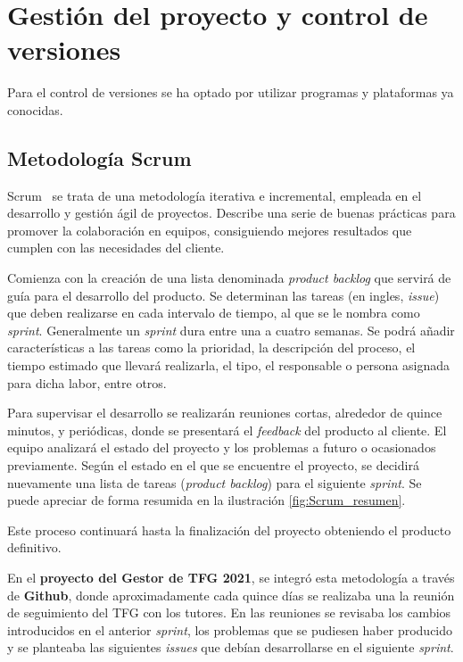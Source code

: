 \section{Gestión del proyecto y control de versiones}
Para el control de versiones se ha optado por utilizar programas y plataformas ya conocidas.

\subsection{Metodología Scrum}
Scrum~\cite{pagina_Scrum} se trata de una metodología iterativa e incremental, empleada en el desarrollo y gestión ágil de proyectos. Describe una serie de buenas prácticas para promover la colaboración en equipos, consiguiendo mejores resultados que cumplen con las necesidades del cliente.

Comienza con la creación de una lista denominada \emph{product backlog} que servirá de guía para el desarrollo del producto. Se determinan las tareas (en ingles, \emph{issue}) que deben realizarse en cada intervalo de tiempo, al que se le nombra como \emph{sprint}. Generalmente un \emph{sprint} dura entre una a cuatro semanas. Se podrá añadir características a las tareas como la prioridad, la descripción del proceso, el tiempo estimado que llevará realizarla, el tipo, el responsable o persona asignada para dicha labor, entre otros.

Para supervisar el desarrollo se realizarán reuniones cortas, alrededor de quince minutos, y periódicas, donde se presentará el \emph{feedback} del producto al cliente. El equipo analizará el estado del proyecto y los problemas a futuro o ocasionados previamente. Según el estado en el que se encuentre el proyecto, se decidirá nuevamente una lista de tareas (\emph{product backlog}) para el siguiente \emph{sprint}. Se puede apreciar de forma resumida en la ilustración \ref{fig:Scrum_resumen}.


Este proceso continuará hasta la finalización del proyecto obteniendo el producto definitivo.

En el \textbf{proyecto del Gestor de TFG 2021}, se integró esta metodología a través de \textbf{Github}, donde aproximadamente cada quince días se realizaba una la reunión de seguimiento del TFG con los tutores. En las reuniones se revisaba los cambios introducidos en el anterior \emph{sprint}, los problemas que se pudiesen haber producido y se planteaba las siguientes \emph{issues} que debían desarrollarse en el siguiente \emph{sprint}.

